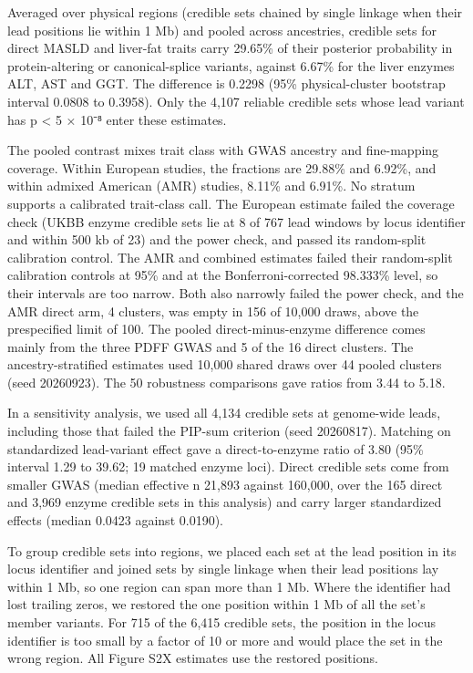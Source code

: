 Averaged over physical regions (credible sets chained by single linkage when their lead positions lie within 1 Mb) and pooled across ancestries, credible sets for direct MASLD and liver-fat traits carry 29.65\% of their posterior probability in protein-altering or canonical-splice variants, against 6.67\% for the liver enzymes ALT, AST and GGT. The difference is 0.2298 (95\% physical-cluster bootstrap interval 0.0808 to 0.3958). Only the 4,107 reliable credible sets whose lead variant has p \textless{} 5 × 10⁻⁸ enter these estimates.

The pooled contrast mixes trait class with GWAS ancestry and fine-mapping coverage. Within European studies, the fractions are 29.88\% and 6.92\%, and within admixed American (AMR) studies, 8.11\% and 6.91\%. No stratum supports a calibrated trait-class call. The European estimate failed the coverage check (UKBB enzyme credible sets lie at 8 of 767 lead windows by locus identifier and within 500 kb of 23) and the power check, and passed its random-split calibration control. The AMR and combined estimates failed their random-split calibration controls at 95\% and at the Bonferroni-corrected 98.333\% level, so their intervals are too narrow. Both also narrowly failed the power check, and the AMR direct arm, 4 clusters, was empty in 156 of 10,000 draws, above the prespecified limit of 100. The pooled direct-minus-enzyme difference comes mainly from the three PDFF GWAS and 5 of the 16 direct clusters. The ancestry-stratified estimates used 10,000 shared draws over 44 pooled clusters (seed 20260923). The 50 robustness comparisons gave ratios from 3.44 to 5.18.

In a sensitivity analysis, we used all 4,134 credible sets at genome-wide leads, including those that failed the PIP-sum criterion (seed 20260817). Matching on standardized lead-variant effect gave a direct-to-enzyme ratio of 3.80 (95\% interval 1.29 to 39.62; 19 matched enzyme loci). Direct credible sets come from smaller GWAS (median effective n 21,893 against 160,000, over the 165 direct and 3,969 enzyme credible sets in this analysis) and carry larger standardized effects (median 0.0423 against 0.0190).

To group credible sets into regions, we placed each set at the lead position in its locus identifier and joined sets by single linkage when their lead positions lay within 1 Mb, so one region can span more than 1 Mb. Where the identifier had lost trailing zeros, we restored the one position within 1 Mb of all the set's member variants. For 715 of the 6,415 credible sets, the position in the locus identifier is too small by a factor of 10 or more and would place the set in the wrong region. All Figure S2X estimates use the restored positions.

